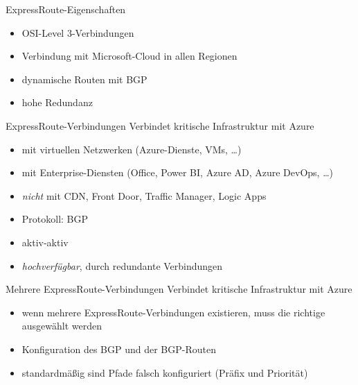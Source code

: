 \begin{flashcard}[]{ExpressRoute-Eigenschaften}
  \begin{itemize}
    \item OSI-Level 3-Verbindungen
    \item Verbindung mit Microsoft-Cloud in allen Regionen
    \item dynamische Routen mit BGP
    \item hohe Redundanz
  \end{itemize}
\end{flashcard}

\begin{flashcard}[]{ExpressRoute-Verbindungen}
  Verbindet kritische Infrastruktur mit Azure
  \begin{itemize}
    \item mit virtuellen Netzwerken (Azure-Dienste, VMs, \ldots)
    \item mit Enterprise-Diensten (Office, Power BI, Azure AD, Azure DevOps, \ldots)
    \item \emph{nicht} mit CDN, Front Door, Traffic Manager, Logic Apps
    \item Protokoll: BGP
    \item aktiv-aktiv
    \item \emph{hochverfügbar}, durch redundante Verbindungen
  \end{itemize}
\end{flashcard}

\begin{flashcard}[]{Mehrere ExpressRoute-Verbindungen}
  Verbindet kritische Infrastruktur mit Azure
  \begin{itemize}
    \item wenn mehrere ExpressRoute-Verbindungen existieren, muss die richtige ausgewählt werden
    \item Konfiguration des BGP und der BGP-Routen
    \item standardmäßig sind Pfade falsch konfiguriert (Präfix und Priorität)
  \end{itemize}
\end{flashcard}

